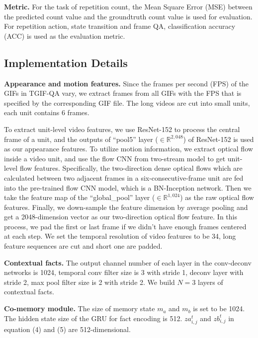 \documentclass[10pt,twocolumn,letterpaper]{article}
\begin{document}
\textbf{Metric.} For the task of repetition count, the Mean Square Error (MSE) between the predicted count value and the groundtruth count value is used for evaluation. For repetition action, state transition and frame QA, classification accuracy (ACC) is used as the evaluation metric.

\subsection{Implementation Details}
\textbf{Appearance and motion features.} Since the frames per second (FPS) of the GIFs in TGIF-QA \cite{Jang_2017_CVPR} vary, we extract frames from all GIFs with the FPS that is specified by the corresponding GIF file. The long videos are cut into small units, each unit contains 6 frames.

To extract unit-level video features, we use ResNet-152 \cite{He_2016_CVPR_resnet}  to process the central frame of a unit, and the outputs of ``pool5'' layer ($\in{\mathbb {R}^{2,048}}$) of ResNet-152 is used as our appearance features. To utilize motion information, we extract optical flow inside a video unit, and use the flow CNN from two-stream model \cite{xiong2016cuhk} to get unit-level flow features. Specifically, the two-direction dense optical flows \cite{farneback2003two} which are calculated between two adjacent frames in a six-consecutive-frame unit are fed into the pre-trained flow CNN model, which is a BN-Inception network\cite{ioffe2015batch}. Then we take the feature map of the ``global\_pool'' layer ($\in{\mathbb {R}^{1,024}}$) as the raw optical flow features. Finally, we down-sample the feature dimension by average pooling and get a 2048-dimension vector as our two-direction optical flow feature. In this process, we pad the first or last frame if we didn't have enough frames centered at each step. We set the temporal resolution of video features to be 34, long feature sequences are cut and short one are padded.

\textbf{Contextual facts.} The output channel number of each layer in the conv-deconv networks is 1024, temporal conv filter size is 3 with stride 1, deconv layer with stride 2, max pool filter size is 2 with stride 2. We build $N=3$ layers of contextual facts.

\textbf{Co-memory module.} The size of memory state $m_a$ and $m_b$ is set to be 1024. The hidden state size of the GRU for fact encoding is 512. $za_{i,j}^t$ and $zb_{i,j}^t$ in equation (4) and (5) are 512-dimensional.
\end{document}
